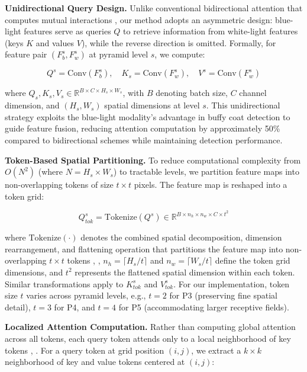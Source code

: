 \textbf{Unidirectional Query Design.} Unlike conventional bidirectional attention that computes mutual interactions \cite{attention}, our method adopts an asymmetric design: blue-light features serve as queries $Q$ to retrieve information from white-light features (keys $K$ and values $V$), while the reverse direction is omitted. Formally, for feature pair $(F_b^s, F_w^s)$ at pyramid level $s$, we compute:

\begin{equation}
Q^s = \text{Conv}(F_b^s), \quad K_s = \text{Conv}(F_w^s), \quad V^s = \text{Conv}(F_w^s)
\end{equation}

where $Q_s, K_s, V_s \in \mathbb{R}^{B \times C \times H_s \times W_s}$, with $B$ denoting batch size, $C$ channel dimension, and $(H_s, W_s)$ spatial dimensions at level $s$. This unidirectional strategy exploits the blue-light modality's advantage in buffy coat detection to guide feature fusion, reducing attention computation by approximately 50\% compared to bidirectional schemes while maintaining detection performance.

\textbf{Token-Based Spatial Partitioning.} To reduce computational complexity from $O(N^2)$ (where $N = H_s \times W_s$) to tractable levels, we partition feature maps into non-overlapping tokens of size $t \times t$ pixels. The feature map is reshaped into a token grid:

\begin{equation}
Q^s_{tok} = \text{Tokenize}(Q^s) \in \mathbb{R}^{B \times n_h \times n_w \times C \times t^2}
\end{equation}

where $\text{Tokenize}(\cdot)$ denotes the combined spatial decomposition, dimension rearrangement, and flattening operation that partitions the feature map into non-overlapping $t \times t$ tokens \cite{dualattention}, \cite{spatial}, $n_h = \lceil H_s / t \rceil$ and $n_w = \lceil W_s / t \rceil$ define the token grid dimensions, and $t^2$ represents the flattened spatial dimension within each token. Similar transformations apply to $K^s_{tok}$ and $V^s_{tok}$. For our implementation, token size $t$ varies across pyramid levels, e.g., $t=2$ for P3 (preserving fine spatial detail), $t=3$ for P4, and $t=4$ for P5 (accommodating larger receptive fields).

\textbf{Localized Attention Computation.} Rather than computing global attention across all tokens, each query token attends only to a local neighborhood of key tokens \cite{slide}, \cite{region}. For a query token at grid position $(i, j)$, we extract a $k \times k$ neighborhood of key and value tokens centered at $(i, j)$:

